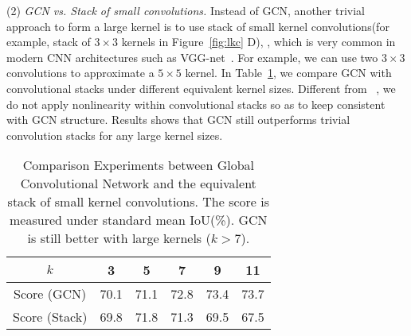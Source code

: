 \documentclass[10pt,twocolumn,letterpaper]{article}
\begin{document}
\par
	(2) \emph{GCN vs. Stack of small convolutions.} Instead of GCN, another trivial approach to form a large kernel is to use stack of small kernel convolutions(for example, stack of $3\times 3$ kernels in Figure~\ref{fig:lkc} D), , which is very common in modern CNN architectures such as VGG-net~\cite{simonyan2014very}. For example, we can use two $3\times 3$ convolutions to approximate a $5\times 5$ kernel. In Table~\ref{table:exp-on-stack}, we compare GCN with convolutional stacks under different equivalent kernel sizes. Different from ~\cite{simonyan2014very}, we do not apply nonlinearity within convolutional stacks so as to keep consistent with GCN structure. Results shows that GCN still outperforms trivial convolution stacks for any large kernel sizes. 
   \begin{table}[h]
      \begin{center}
         \begin{tabular}{|c|c|c|c|c|c|}
         	\hline
         	$k$ & 3 & 5 & 7 & 9 & 11\\
         	\hline
         	Score (GCN)  & 70.1 & 71.1 & 72.8 & 73.4 & 73.7\\
         	\hline
         	Score (Stack) & 69.8 & 71.8 & 71.3 & 69.5 & 67.5 \\
\hline
         \end{tabular}
      \end{center}
      \caption{Comparison Experiments between Global Convolutional Network and the equivalent stack of small kernel convolutions. The score is measured under standard mean IoU(\%). GCN is still better with large kernels ($k>7$). }
      \label{table:exp-on-stack}
   \end{table}
   
\end{document}
